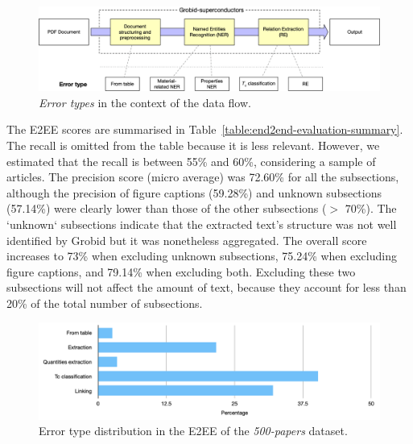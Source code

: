 \begin{figure}[htbp]
    \centering
    \includegraphics[width=\textwidth]{figures/automatic_extraction_supercon/error-types-colors}
    \caption{\textit{Error types} in the context of the data flow. }
    \label{fig:error-types}
\end{figure}

The E2EE scores are summarised in Table~\ref{table:end2end-evaluation-summary}.
The recall is omitted from the table because it is less relevant. However, we estimated that the recall is between 55\% and 60\%, considering a sample of articles. 
The precision score (micro average) was 72.60\% for all the subsections, although the precision of figure captions (59.28\%) and unknown subsections (57.14\%) were clearly lower than those of the other subsections ($>$ 70\%).
The `unknown` subsections indicate that the extracted text's structure was not well identified by Grobid but it was nonetheless aggregated.
The overall score increases to 73\% when excluding unknown subsections, 75.24\% when excluding figure captions, and 79.14\%  when excluding both.
Excluding these two subsections will not affect the amount of text, because they account for less than 20\% of the total number of subsections.

\begin{figure}[htbp]
    \centering
    \includegraphics[width=\linewidth]{figures/automatic_extraction_supercon/error-types-bars-perc}
    \caption{Error type distribution in the E2EE of the \textit{500-papers} dataset.}
    \label{fig:error-types-distribution}
\end{figure}

